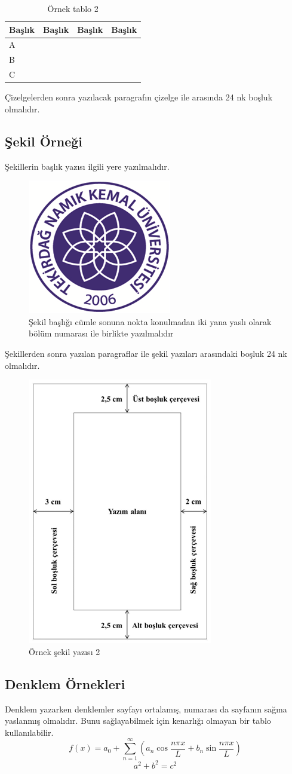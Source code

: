 \documentclass[tekyonlu,turkce,yukseklisans,karton,fenbilimleri]{tnkutez}
\begin{document}
\begin{table}[!t]
	\caption{Örnek tablo 2}
	\begin{tabular}{L{3cm}L{3cm}L{3cm}L{3cm}}
		\hline
		Başlık&Başlık&Başlık&Başlık\\\hline
		A&&&\\
		B&&&\\
		C&&&\\
		\hline
	\end{tabular}
	\vspace{24pt}	
\end{table}

Çizelgelerden sonra yazılacak paragrafın çizelge ile arasında 24 nk boşluk olmalıdır. 

\subsection{Şekil Örneği}
Şekillerin başlık yazısı ilgili yere yazılmalıdır.

\begin{figure}[!h]
	\includegraphics[width=0.2\linewidth]{sekiller/nku_logo}
	\caption{Şekil başlığı cümle sonuna nokta konulmadan iki yana yaslı olarak bölüm numarası ile birlikte yazılmalıdır}
	\label{fig:nkulogo}
	\vspace{24pt}
\end{figure}

Şekillerden sonra yazılan paragraflar ile şekil yazıları arasındaki boşluk 24 nk olmalıdır. 

\begin{figure}
	\includegraphics[width=0.2\linewidth]{sekiller/sekil}
	\caption{Örnek şekil yazısı 2}
	\label{fig:sekil}
	\vspace{24pt}
\end{figure}

\subsection{Denklem Örnekleri}
Denklem yazarken denklemler sayfayı ortalamış, numarası da sayfanın sağına yaslanmış olmalıdır. Bunu sağlayabilmek için kenarlığı olmayan bir tablo kullanılabilir.
\begin{equation}
f(x)=a_0+\sum_{n=1}^{\infty}\left(a_n\cos\frac{n\pi x}{L}+b_n\sin\frac{n\pi x}{L}\right)
\end{equation}
\begin{equation}
a^2+b^2=c^2
\end{equation}
\end{document}
